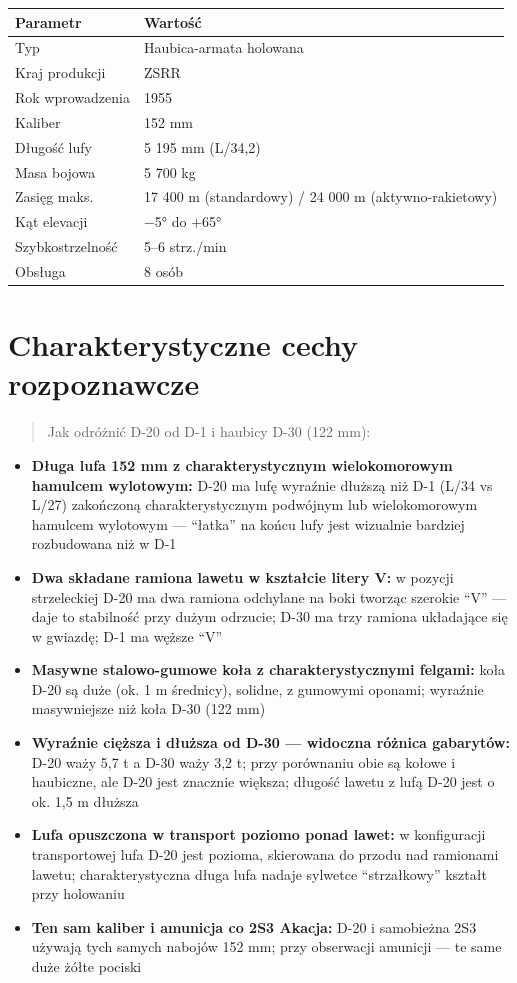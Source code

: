 \documentclass[12pt,openany,oneside]{book}
\providecommand{\tightlist}{%
  \setlength{\itemsep}{0pt}\setlength{\parskip}{0pt}}
\begin{document}
\begin{longtable}[]{@{}ll@{}}
\toprule\noalign{}
Parametr & Wartość \\
\midrule\noalign{}
\endhead
\bottomrule\noalign{}
\endlastfoot
Typ & Haubica-armata holowana \\
Kraj produkcji & ZSRR \\
Rok wprowadzenia & 1955 \\
Kaliber & 152 mm \\
Długość lufy & 5 195 mm (L/34,2) \\
Masa bojowa & 5 700 kg \\
Zasięg maks. & 17 400 m (standardowy) / 24 000 m (aktywno-rakietowy) \\
Kąt elevacji & −5° do +65° \\
Szybkostrzelność & 5--6 strz./min \\
Obsługa & 8 osób \\
\end{longtable}

\section{Charakterystyczne cechy
rozpoznawcze}\label{charakterystyczne-cechy-rozpoznawcze-20}

\begin{quote}
Jak odróżnić D-20 od D-1 i haubicy D-30 (122 mm):
\end{quote}

\begin{itemize}
\tightlist
\item
  \textbf{Długa lufa 152 mm z charakterystycznym wielokomorowym hamulcem
  wylotowym:} D-20 ma lufę wyraźnie dłuższą niż D-1 (L/34 vs L/27)
  zakończoną charakterystycznym podwójnym lub wielokomorowym hamulcem
  wylotowym --- ``łatka'' na końcu lufy jest wizualnie bardziej
  rozbudowana niż w D-1
\item
  \textbf{Dwa składane ramiona lawetu w kształcie litery V:} w pozycji
  strzeleckiej D-20 ma dwa ramiona odchylane na boki tworząc szerokie
  ``V'' --- daje to stabilność przy dużym odrzucie; D-30 ma trzy ramiona
  układające się w gwiazdę; D-1 ma węższe ``V''
\item
  \textbf{Masywne stalowo-gumowe koła z charakterystycznymi felgami:}
  koła D-20 są duże (ok. 1 m średnicy), solidne, z gumowymi oponami;
  wyraźnie masywniejsze niż koła D-30 (122 mm)
\item
  \textbf{Wyraźnie cięższa i dłuższa od D-30 --- widoczna różnica
  gabarytów:} D-20 waży 5,7 t a D-30 waży 3,2 t; przy porównaniu obie są
  kołowe i haubiczne, ale D-20 jest znacznie większa; długość lawetu z
  lufą D-20 jest o ok. 1,5 m dłuższa
\item
  \textbf{Lufa opuszczona w transport poziomo ponad lawet:} w
  konfiguracji transportowej lufa D-20 jest pozioma, skierowana do
  przodu nad ramionami lawetu; charakterystyczna długa lufa nadaje
  sylwetce ``strzałkowy'' kształt przy holowaniu
\item
  \textbf{Ten sam kaliber i amunicja co 2S3 Akacja:} D-20 i samobieżna
  2S3 używają tych samych nabojów 152 mm; przy obserwacji amunicji ---
  te same duże żółte pociski
\end{itemize}
\end{document}
